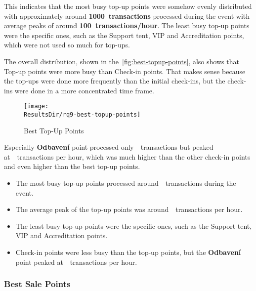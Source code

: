 This indicates that the most busy top-up points were somehow evenly distributed with approximately around \textbf{1000~transactions} processed during the event with average peaks of around \textbf{100~transactions/hour}.
The least busy top-up points were the specific ones, such as the Support tent, VIP and Accreditation points, which were not used so much for top-ups.

The overall distribution, shown in the~\autoref{fig:best-topup-points}, also shows that Top-up points were more busy than Check-in points.
That makes sense because the top-ups were done more frequently than the initial check-ins, but the check-ins were done in a more concentrated time frame.

\begin{figure}[H]
	\centering
	\texttt{[image: \\ResultsDir/rq9-best-topup-points]}
	\caption{Best Top-Up Points}
	\label{fig:best-topup-points}
	\source
\end{figure}

Especially \textbf{Odbavení} point processed only~~transactions but peaked at~~transactions per hour, which was much higher than the other check-in points and even higher than the best top-up points.

\begin{keytakeaways}
	\begin{itemize}
		\item The most busy top-up points processed around~~transactions during the event.
		\item The average peak of the top-up points was around~~transactions per hour.
		\item The least busy top-up points were the specific ones, such as the Support tent, VIP and Accreditation points.
		\item Check-in points were less busy than the top-up points, but the \textbf{Odbavení} point peaked at~~transactions per hour.
	\end{itemize}
\end{keytakeaways}


\subsubsection{Best Sale Points}
\label{subsubsec:analysis-best-sale-points}


